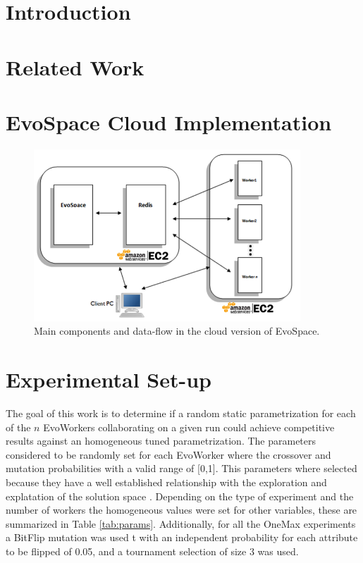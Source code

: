 \documentclass{llncs}
\begin{document}
\section{Introduction}

\section{Related Work}

\section{EvoSpace Cloud Implementation}
\begin{figure}[t]
    \centering
        \includegraphics[width=10cm]{img/evospace-aws.png}
    \caption{Main components and data-flow in the cloud version of EvoSpace. }
    \label{fig:evospace}
\end{figure}

\section{Experimental Set-up}
The goal of this work is to determine if a random static parametrization for each of the $n$ EvoWorkers 
collaborating on a given run could achieve competitive results against an homogeneous tuned parametrization.
The parameters considered to be randomly set for each EvoWorker where the crossover and mutation probabilities 
with a valid range of [0,1]. This parameters where selected because they have a well established relationship 
with the exploration and explatation of the solution space \cite{}. Depending on the type of experiment 
and the number of workers the homogeneous values were set for other variables, these are summarized
in Table \ref{tab:params}. Additionally, for all the OneMax experiments a BitFlip mutation was used t
with an independent probability for each attribute to be flipped of 0.05, and a tournament selection of size 3
was used.    
\end{document}
